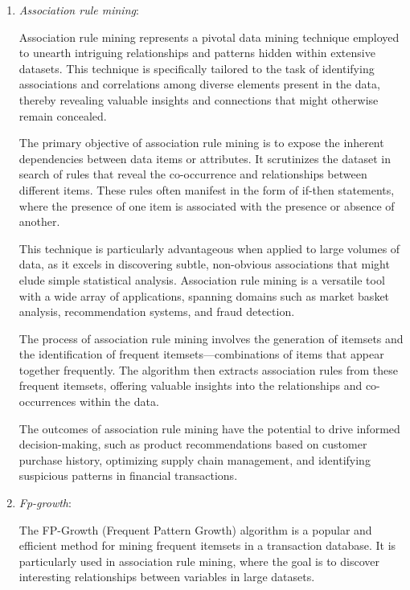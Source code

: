 \documentclass[12pt,a4paper,openright,twoside]{book}
\begin{document}
\begin{enumerate}
    
    \item \emph{Association rule mining}:

        Association rule mining represents a pivotal data mining technique employed to unearth intriguing relationships and patterns hidden within extensive datasets. This technique is specifically tailored to the task of identifying associations and correlations among diverse elements present in the data, thereby revealing valuable insights and connections that might otherwise remain concealed. 

        The primary objective of association rule mining is to expose the inherent dependencies between data items or attributes. It scrutinizes the dataset in search of rules that reveal the co-occurrence and relationships between different items. These rules often manifest in the form of if-then statements, where the presence of one item is associated with the presence or absence of another. 

        This technique is particularly advantageous when applied to large volumes of data, as it excels in discovering subtle, non-obvious associations that might elude simple statistical analysis. Association rule mining is a versatile tool with a wide array of applications, spanning domains such as market basket analysis, recommendation systems, and fraud detection. 

        The process of association rule mining involves the generation of itemsets and the identification of frequent itemsets—combinations of items that appear together frequently. The algorithm then extracts association rules from these frequent itemsets, offering valuable insights into the relationships and co-occurrences within the data. 

        The outcomes of association rule mining have the potential to drive informed decision-making, such as product recommendations based on customer purchase history, optimizing supply chain management, and identifying suspicious patterns in financial transactions.

    \item \emph{Fp-growth}:
    
        The FP-Growth (Frequent Pattern Growth) algorithm is a popular and efficient method for mining frequent itemsets in a transaction database. It is particularly used in association rule mining, where the goal is to discover interesting relationships between variables in large datasets.


\end{enumerate}
\end{document}

